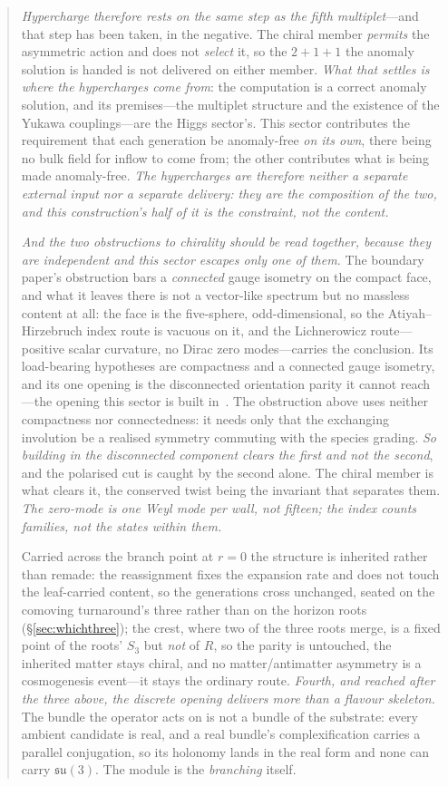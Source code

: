 \documentclass[11pt]{article}
\newcommand{\su}{\mathfrak{su}}
\begin{document}
\begin{abstract}
\emph{Hypercharge therefore rests on the same step as the fifth multiplet}---and that step has been taken, in the negative. The chiral member \emph{permits} the asymmetric action and does not \emph{select} it, so the $2+1+1$ the anomaly solution is handed is not delivered on either member. \emph{What that settles is where the hypercharges come from}: the computation is a correct anomaly solution, and its premises---the multiplet structure and the existence of the Yukawa couplings---are the Higgs sector's. This sector contributes the requirement that each generation be anomaly-free \emph{on its own}, there being no bulk field for inflow to come from; the other contributes what is being made anomaly-free. \emph{The hypercharges are therefore neither a separate external input nor a separate delivery: they are the composition of the two, and this construction's half of it is the constraint, not the content.} 

\emph{And the two obstructions to chirality should be read together, because they are independent and this sector escapes only one of them.} The boundary paper's obstruction bars a \emph{connected} gauge isometry on the compact face, and what it leaves there is not a vector-like spectrum but no massless content at all: the face is the five-sphere, odd-dimensional, so the Atiyah--Hirzebruch index route is vacuous on it, and the Lichnerowicz route---positive scalar curvature, no Dirac zero modes---carries the conclusion. Its load-bearing hypotheses are compactness and a connected gauge isometry, and its one opening is the disconnected orientation parity it cannot reach---the opening this sector is built in~\cite{JanzenBoundary}. The obstruction above uses neither compactness nor connectedness: it needs only that the exchanging involution be a realised symmetry commuting with the species grading. \emph{So building in the disconnected component clears the first and not the second}, and the polarised cut is caught by the second alone. The chiral member is what clears it, the conserved twist being the invariant that separates them. \emph{The zero-mode is one Weyl mode per wall, not fifteen; the index counts families, not the states within them.} 

Carried across the branch point at $r=0$ the structure is inherited rather than remade: the reassignment fixes the expansion rate and does not touch the leaf-carried content, so the generations cross unchanged, seated on the comoving turnaround's three rather than on the horizon roots (\S\ref{sec:whichthree}); the crest, where two of the three roots merge, is a fixed point of the roots' $S_3$ but \emph{not} of $R$, so the parity is untouched, the inherited matter stays chiral, and no matter/antimatter asymmetry is a cosmogenesis event---it stays the ordinary route. \emph{Fourth, and reached after the three above, the discrete opening delivers more than a flavour skeleton.} The bundle the operator acts on is not a bundle of the substrate: every ambient candidate is real, and a real bundle's complexification carries a parallel conjugation, so its holonomy lands in the real form and none can carry $\su(3)$. The module is the \emph{branching} itself. 


\end{abstract}
\end{document}

